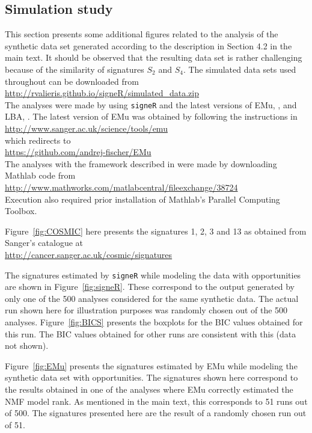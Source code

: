 \documentclass[11pt]{amsart}
\theoremstyle{definition}
\begin{document}
\subsection{Simulation study}
This section presents some additional figures related to the analysis
of the synthetic data set generated according to the description in
Section 4.2 in the main text. It should be observed that the resulting
data set is rather challenging because of the similarity of signatures
$S_2$ and $S_4$. The simulated data sets used throughout can be downloaded from\\
\indent\indent\url{http://rvalieris.github.io/signeR/simulated_data.zip}\\
The analyses were made by using \texttt{signeR} and
the latest versions of EMu, \cite{FICMV}, and LBA, \cite{A}. The
latest version of EMu was obtained by following the instructions in\\
\indent\indent\url{http://www.sanger.ac.uk/science/tools/emu}\\  
which redirects to\\ 
\indent\indent\url{https://github.com/andrej-fischer/EMu}\\
The analyses with the framework described in \cite{A} were made by
downloading Mathlab code from\\
\indent\indent\url{http://www.mathworks.com/matlabcentral/fileexchange/38724}\\
Execution also required prior installation of Mathlab's Parallel
Computing Toolbox.

Figure~\ref{fig:COSMIC} here presents the signatures 1, 2, 3 and 13 as
obtained from Sanger's catalogue at\\
\indent\indent\url{http://cancer.sanger.ac.uk/cosmic/signatures}

The signatures estimated by \texttt{signeR} while modeling the data
with opportunities are shown in Figure~\ref{fig:signeR}. These
correspond to the output generated by only one of the 500 analyses
considered for the same synthetic data. The actual run shown here for
illustration purposes was randomly chosen out of the 500 analyses.
Figure~\ref{fig:BICS} presents the boxplots for the BIC values
obtained for this run. The BIC values obtained for other runs are
consistent with this (data not shown).

Figure~\ref{fig:EMu} presents the signatures estimated by EMu  while
modeling the synthetic data set with opportunities. The signatures
shown here correspond to the results obtained in one of the analyses
where EMu correctly estimated the NMF model rank. As mentioned in the
main text, this corresponds to 51 runs out of 500. The signatures
presented here are the result of a randomly chosen run out of 51.
\end{document}
